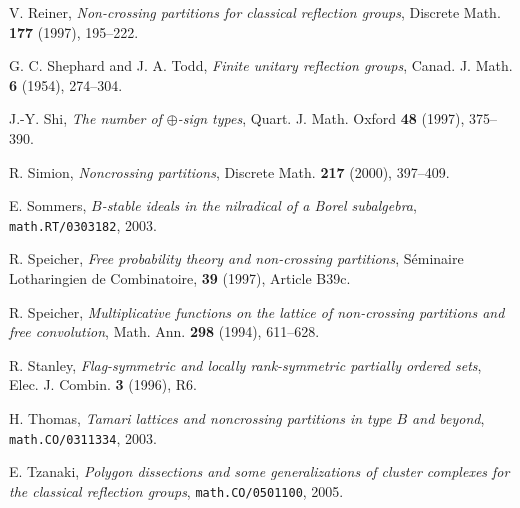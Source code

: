 \documentclass[12pt,letterpaper, reqno]{aimpl}
\begin{document}
\begin{thebibliography}{99}
V. Reiner, \emph{Non-crossing partitions for classical reflection groups}, Discrete Math. {\bf 177} (1997), 195--222.

G. C. Shephard and J. A. Todd, \emph{Finite unitary reflection groups}, Canad. J. Math. {\bf 6} (1954), 274--304.

J.-Y. Shi, \emph{The number of $\oplus$-sign types}, Quart. J. Math. Oxford {\bf 48} (1997), 375--390.

R. Simion, \emph{Noncrossing partitions}, Discrete Math. {\bf 217} (2000), 397--409.

E. Sommers, \emph{$B$-stable ideals in the nilradical of a Borel subalgebra}, \texttt{math.RT/0303182}, 2003.

R. Speicher, \emph{Free probability theory and non-crossing partitions}, S\'eminaire Lotharingien de Combinatoire, {\bf 39} (1997), Article B39c.

R. Speicher, \emph{Multiplicative functions on the lattice of non-crossing partitions and free convolution}, Math. Ann. {\bf 298} (1994), 611--628.

R. Stanley, \emph{Flag-symmetric and locally rank-symmetric partially ordered sets}, Elec. J. Combin. {\bf 3} (1996), R6.

H. Thomas, \emph{Tamari lattices and noncrossing partitions in type $B$ and beyond}, \texttt{math.CO/0311334}, 2003.

E. Tzanaki, \emph{Polygon dissections and some generalizations of cluster complexes for the classical reflection groups}, \texttt{math.CO/0501100}, 2005.

\end{thebibliography}
\end{document}
